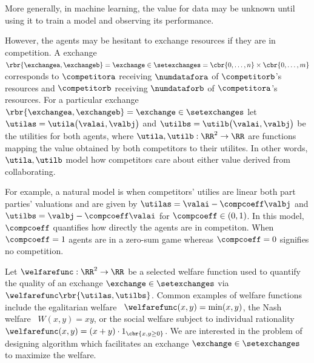 More generally, in machine learning, the value for data may be unknown until using it to train a model and
observing its performance. 

However, the agents may be hesitant to exchange resources if they are in competition. 
A exchange 
\(
    \rbr{\exchangea,\exchangeb}
    =
    \exchange\in\setexchanges
    =
    \cbr{0,\ldots,n}\times\cbr{0,\ldots,m}
\)
corresponds to $\competitora$ receiving $\numdatafora$ of $\competitorb$'s resources and 
$\competitorb$ receiving $\numdataforb$ of $\competitora$'s resources.
For a particular exchange 
\(
    \rbr{\exchangea,\exchangeb}
    =
    \exchange\in\setexchanges
\)
let
\(
    \utilas = \utila\big(\valai,\valbj\big)
\)
and
\(
    \utilbs = \utilb\big(\valai,\valbj\big)
\)
be the utilities for both agents,
where
\(
    \utila,\utilb:\RR^2\rightarrow\RR
\)
are functions mapping the value obtained by both competitors to their utilites.
In other words, $\utila,\utilb$ model how competitors care about either value 
derived from collaborating.

For example, a natural model is when competitors' utilies are linear both part parties'
valuations and are given by
\(
    \utilas
    =
    \valai-\compcoeff\valbj
\)
and
\(
    \utilbs
    =
    \valbj-\compcoeff\valai
\)
for $\compcoeff\in(0,1)$.
In this model, $\compcoeff$ quantifies how directly the agents are in competiton.
When $\compcoeff=1$ agents are in a zero-sum game whereas $\compcoeff=0$
signifies no competition. 

Let $\welfarefunc:\RR^2\rightarrow\RR$ be a selected welfare function used to quantify the quality of an exchange
$\exchange\in\setexchanges$ via $\welfarefunc\rbr{\utilas,\utilbs}$. 
Common examples of welfare functions include the egalitarian welfare~\citep{mas1995microeconomic} 
$\welfarefunc(x,y)=\min(x,y)$, the 
Nash welfare~\citep{nash1950bargaining} $W(x,y)=xy$, or the social welfare subject to individual rationality 
$\welfarefunc(x,y)=(x+y)\cdot 1_{\cbr{x,y\geq 0}}$. We are interested in the problem of designing  
algorithm which facilitates an exchange $\exchange\in\setexchanges$ to maximize the welfare.

